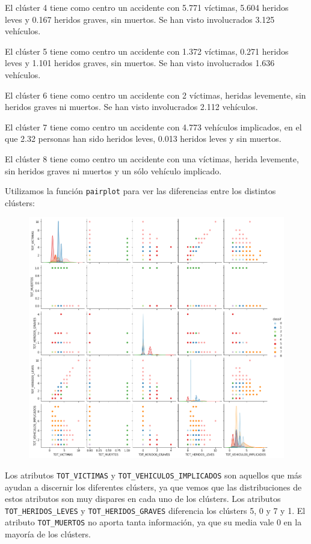 \documentclass[a4]{article}
\begin{document}
El clúster 4 tiene como centro un accidente con 5.771 víctimas, 5.604 heridos leves y 0.167 heridos graves, sin muertos. Se han visto involucrados 3.125 vehículos.

El clúster 5 tiene como centro un accidente con 1.372 víctimas, 0.271 heridos leves y 1.101 heridos graves, sin muertos. Se han visto involucrados 1.636 vehículos.

El clúster 6 tiene como centro un accidente con 2 víctimas, heridas levemente, sin heridos graves ni muertos. Se han visto involucrados 2.112 vehículos.

El clúster 7 tiene como centro un accidente con 4.773 vehículos implicados, en el que 2.32 personas han sido heridos leves, 0.013 heridos leves y sin muertos.

El clúster 8 tiene como centro un accidente con una víctimas, herida levemente, sin heridos graves ni muertos y un sólo vehículo implicado.

Utilizamos la función \texttt{pairplot} para ver las diferencias entre los distintos clústers:

\begin{figure}[H]
  \centering
  \includegraphics[width=180mm]{imagenes/c2_kmeans_pairplot}
\end{figure}

Los atributos \texttt{TOT\_VICTIMAS} y \texttt{TOT\_VEHICULOS\_IMPLICADOS} son aquellos que más ayudan a discernir los diferentes clústers, ya que vemos que las distribuciones de estos atributos son muy dispares en cada uno de los clústers. Los atributos \texttt{TOT\_HERIDOS\_LEVES} y \texttt{TOT\_HERIDOS\_GRAVES} diferencia los clústers 5, 0 y 7 y 1. El atributo \texttt{TOT\_MUERTOS} no aporta tanta información, ya que su media vale 0 en la mayoría de los clústers.
\end{document}
